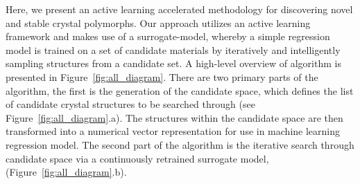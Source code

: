 %
%
%
%
%



%
%
Here, we present an active learning accelerated methodology for discovering novel and stable crystal polymorphs.
%
Our approach utilizes an active learning framework and makes use of a surrogate-model,
whereby a simple regression model is trained on a set of candidate materials by iteratively and intelligently sampling structures from a candidate set.
%
A high-level overview of algorithm is presented in Figure~\ref{fig:all_diagram}.
%
There are two primary parts of the algorithm, the first is the generation of the candidate space,
which defines the list of candidate crystal structures to be searched through (see Figure~\ref{fig:all_diagram}.a).
%
The structures within the candidate space are then transformed into a numerical vector representation for use in machine learning regression model.
%
The second part of the algorithm is the iterative search through candidate space via a continuously retrained surrogate model, (Figure~\ref{fig:all_diagram}.b).

